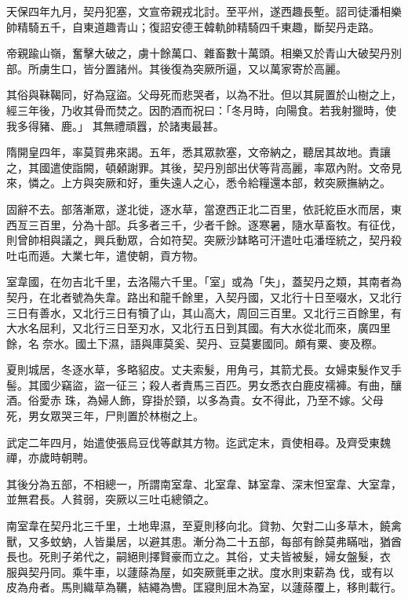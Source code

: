 \begin{pinyinscope}
 天保四年九月，契丹犯塞，文宣帝親戎北討。至平州，遂西趣長塹。詔司徒潘相樂帥精騎五千，自東道趣青山；復詔安德王韓軌帥精騎四千東趣，斷契丹走路。



 帝親踰山嶺，奮擊大破之，虜十餘萬口、雜畜數十萬頭。相樂又於青山大破契丹別部。所虜生口，皆分置諸州。其後復為突厥所逼，又以萬家寄於高麗。



 其俗與靺鞨同，好為寇盜。父母死而悲哭者，以為不壯。但以其屍置於山樹之上，經三年後，乃收其骨而焚之。因酌酒而祝曰：「冬月時，向陽食。若我射獵時，使我多得豬、鹿。」
 其無禮頑囂，於諸夷最甚。



 隋開皇四年，率莫賀弗來謁。五年，悉其眾款塞，文帝納之，聽居其故地。責讓之，其國遣使詣闕，頓顙謝罪。其後，契丹別部出伏等背高麗，率眾內附。文帝見來，憐之。上方與突厥和好，重失遠人之心，悉令給糧還本部，敕突厥撫納之。



 固辭不去。部落漸眾，遂北徙，逐水草，當遼西正北二百里，依託紇臣水而居，東西亙三百里，分為十部。兵多者三千，少者千餘。逐寒暑，隨水草畜牧。有征伐，則曾帥相與議之，興兵動眾，合如符契。突厥沙缽略可汗遣吐屯潘垤統之，契丹殺吐屯而遁。大業七年，遣使朝，貢方物。



 室韋國，在勿吉北千里，去洛陽六千里。「室」或為「失」，蓋契丹之類，其南者為契丹，在北者號為失韋。路出和龍千餘里，入契丹國，又北行十日至啜水，又北行三日有善水，又北行三日有犢了山，其山高大，周回三百里。又北行三百餘里，有大水名屈利，又北行三日至刃水，又北行五日到其國。有大水從北而來，廣四里餘，名奈水。國土下濕，語與庫莫奚、契丹、豆莫婁國同。頗有粟、麥及穄。



 夏則城居，冬逐水草，多略貂皮。丈夫索髮，用角弓，其箭尤長。女婦束髮作叉手髻。其國少竊盜，盜一征三；殺人者責馬三百匹。男女悉衣白鹿皮襦褲。有曲，釀酒。俗愛赤
 珠，為婦人飾，穿掛於頸，以多為貴。女不得此，乃至不嫁。父母死，男女眾哭三年，尸則置於林樹之上。



 武定二年四月，始遣使張烏豆伐等獻其方物。迄武定末，貢使相尋。及齊受東魏禪，亦歲時朝聘。



 其後分為五部，不相總一，所謂南室韋、北室韋、缽室韋、深末怛室韋、大室韋，並無君長。人貧弱，突厥以三吐屯總領之。



 南室韋在契丹北三千里，土地卑濕，至夏則移向北。貸勃、欠對二山多草木，饒禽獸，又多蚊蚋，人皆巢居，以避其患。漸分為二十五部，每部有餘莫弗瞞咄，猶酋長也。死則子弟代之，嗣絕則擇賢豪而立之。其俗，丈夫皆被髮，婦女盤髮，衣
 服與契丹同。乘牛車，以蘧蒢為屋，如突厥氈車之狀。度水則束薪為伐，或有以皮為舟者。馬則織草為韉，結繩為轡。匡寢則屈木為室，以蘧蒢覆上，移則載行。




\end{pinyinscope}
